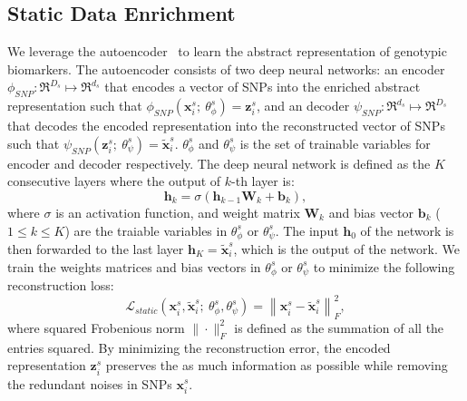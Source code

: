 \subsection{Static Data Enrichment}
We leverage the autoencoder~\cite{kramer1991nonlinear} to learn the abstract representation of genotypic biomarkers. The autoencoder consists of two deep neural networks: an encoder $\phi_{SNP}: \Re^{D_s} \mapsto \Re^{d_s}$ that encodes a vector of SNPs into the enriched abstract representation such that $\phi_{SNP}(\mathbf{x}_i^s;\ \theta^s_{\phi}) = \mathbf{z}_i^s$, and an decoder $\psi_{SNP}: \Re^{d_s} \mapsto \Re^{D_s}$ that decodes the encoded representation into the reconstructed vector of SNPs such that $\psi_{SNP}(\mathbf{z}_i^s;\ \theta^s_{\psi}) = \tilde{\mathbf{x}}_i^s$. $\theta_{\phi}^s$ and $\theta_{\psi}^s$ is the set of trainable variables for encoder and decoder respectively. The deep neural network is defined as the $K$ consecutive layers where the output of $k$-th layer is:
\begin{equation}
    \mathbf{h}_k = \sigma(\mathbf{h}_{k-1}\mathbf{W}_k + \mathbf{b}_k),
\end{equation}
where $\sigma$ is an activation function, and weight matrix $\mathbf{W}_k$ and bias vector $\mathbf{b}_k$ ($1 \leq k \leq K$) are the traiable variables in $\theta_{\phi}^s$ or $\theta_{\psi}^s$.
The input $\mathbf{h}_0$ of the network is then forwarded to the last layer $\mathbf{h}_K = \tilde{\mathbf{x}}_i^s$, which is the output of the network. We train the weights matrices and bias vectors in $\theta_{\phi}^s$ or $\theta_{\psi}^s$ to minimize the following reconstruction loss:
\begin{equation}
    \mathcal{L}_{static}(\mathbf{x}_i^s, \tilde{\mathbf{x}}_i^s;\ \theta_{\phi}^s, \theta_{\psi}^s) = \left\|\mathbf{x}_i^s - \tilde{\mathbf{x}}_i^s\right\|_F^2,
\end{equation}
where squared Frobenious norm $\| \cdot \|_F^2$ is defined as the summation of all the entries squared. By minimizing the reconstruction error, the encoded representation $\mathbf{z}_i^s$ preserves the as much information as possible while removing the redundant noises in SNPs $\mathbf{x}_i^s$.


